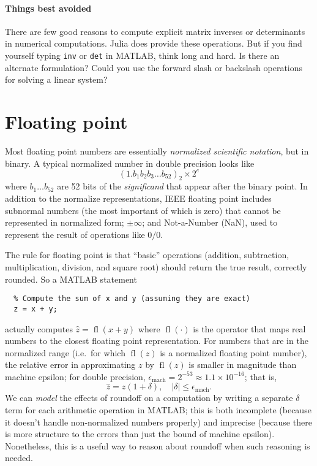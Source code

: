 \documentclass[12pt, leqno]{article}
\begin{document}
\paragraph{Things best avoided}
There are few good reasons to compute explicit matrix inverses or
determinants in numerical computations.  Julia does provide these
operations.  But if you find yourself typing {\tt inv} or {\tt det} in
MATLAB, think long and hard.  Is there an alternate formulation?
Could you use the forward slash or backslash operations for solving a
linear system?

\section{Floating point}
Most floating point numbers are essentially
{\em normalized scientific notation}, but in binary.
A typical normalized number in double precision looks like
\[
  (1.b_1 b_2 b_3 \ldots b_{52})_2 \times 2^{e}
\]
where $b_1 \ldots b_{52}$ are 52 bits of the {\em significand}
that appear after the binary point.  In addition to the normalize
representations, IEEE floating point includes subnormal numbers
(the most important of which is zero) that cannot be represented
in normalized form; $\pm \infty$; and Not-a-Number (NaN), used
to represent the result of operations like $0/0$.

The rule for floating point is that ``basic'' operations
(addition, subtraction, multiplication, division, and square root)
should return the true result, correctly rounded.  So a MATLAB
statement
\begin{lstlisting}
  % Compute the sum of x and y (assuming they are exact)
  z = x + y;
\end{lstlisting}
actually computes $\hat{z} = \operatorname{fl}(x+y)$ where
$\operatorname{fl}(\cdot)$ is the operator that maps real numbers to
the closest floating point representation.  For numbers that are in
the normalized range (i.e.~for which $\operatorname{fl}(z)$ is a
normalized floating point number), the relative error in approximating
$z$ by $\operatorname{fl}(z)$ is smaller in magnitude than machine
epsilon; for double precision, $\epsilon_{\mathrm{mach}} = 2^{-53}
\approx 1.1 \times 10^{-16}$; that is,
\[
  \hat{z} = z(1+\delta), \quad |\delta| \leq \epsilon_{\mathrm{mach}}.
\]
We can {\em model} the effects of roundoff on a computation by writing
a separate $\delta$ term for each arithmetic operation in MATLAB;
this is both incomplete (because it doesn't handle non-normalized
numbers properly) and imprecise (because there is more structure to
the errors than just the bound of machine epsilon).  Nonetheless,
this is a useful way to reason about roundoff when such reasoning
is needed.
\end{document}
